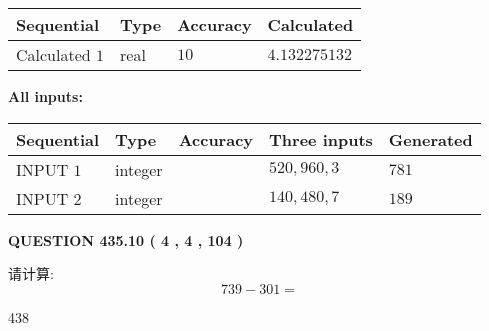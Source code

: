 \documentclass{ctexart}
\begin{document}
   
   
   
\noindent{}
   
   
  
  
\noindent\begin{tabular}{|l|l|l|l|}
\hline
 Sequential & Type & Accuracy & Calculated \\ 
\hline
 
 
  Calculated $  1 $ & real & $  10  $ & 
 $ 4.132275132 $ 
 \\  \hline  
 \end{tabular}
   
   
   
   
\noindent\vspace{0.1in}\hspace{-0.08in} {\textbf{\Large{All inputs: }}}
   
   
  
  
\noindent\begin{tabular}{|l|l|l|l|l|}
\hline
 Sequential & Type & Accuracy & Three inputs & Generated \\ 
\hline
 
 
  INPUT $  1 $ & integer &  & $
 520
 , 
 960
 , 
 3
 $ & $ 781 $ 
 \\  \hline  
 
 
  INPUT $  2 $ & integer &  & $
 140
 , 
 480
 , 
 7
 $ & $ 189 $ 
 \\  \hline  
 \end{tabular}
   
   
  
\vspace{0.2in}
  
{\textbf{\Large{QUESTION
435.10 
 ( 4 , 4 , 104 )
}}}
  
  
 
请计算:
\begin{equation}
739 -   %
301 = \nonumber
\end{equation}
 
 
 
\noindent{}
 
 

438
 
 
\noindent{}
 
 

 
 
 
\noindent{}
 
\end{document}
